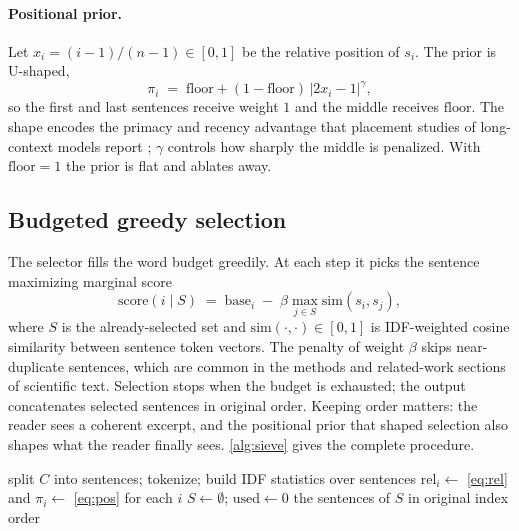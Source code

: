 \documentclass[preprint,12pt]{elsarticle}
\DeclarePairedDelimiter\abs{\lvert}{\rvert}
\theoremstyle{remark}
\newcommand{\method}{Sieve}
\begin{document}
\paragraph{Positional prior.}
Let $x_i = (i-1)/(n-1)\in[0,1]$ be the relative position of $s_i$. The
prior is U-shaped,
\begin{equation}
\label{eq:pos}
\pi_i \;=\; \mathrm{floor} + (1-\mathrm{floor})\,
\lvert 2x_i - 1\rvert^{\gamma},
\end{equation}
so the first and last sentences receive weight $1$ and the middle
receives $\mathrm{floor}$. The shape encodes the primacy and recency
advantage that placement studies of long-context models report
\citep{liu2023lost}; $\gamma$ controls how sharply the middle is
penalized. With $\mathrm{floor}=1$ the prior is flat and ablates away.

\subsection{Budgeted greedy selection}
The selector fills the word budget greedily. At each step it picks the
sentence maximizing marginal score
\begin{equation}
\label{eq:mmr}
\mathrm{score}(i \mid S) \;=\; \mathrm{base}_i
\;-\; \beta \max_{j \in S} \mathrm{sim}(s_i, s_j),
\end{equation}
where $S$ is the already-selected set and
$\mathrm{sim}(\cdot,\cdot)\in[0,1]$ is IDF-weighted cosine similarity
between sentence token vectors. The penalty of weight $\beta$ skips
near-duplicate sentences, which are common in the methods and
related-work sections of scientific text. Selection stops when the
budget is exhausted; the output concatenates selected sentences in
original order. Keeping order matters: the reader sees a coherent
excerpt, and the positional prior that shaped selection also shapes
what the reader finally sees. \autoref{alg:sieve} gives the complete
procedure.

\begin{algorithm}[t]
\caption{\method{} selection}
\label{alg:sieve}
split $C$ into sentences; tokenize; build IDF statistics over
sentences\;
$\mathrm{rel}_i \leftarrow$ \eqref{eq:rel} and
$\pi_i \leftarrow$ \eqref{eq:pos} for each $i$\;
$S \leftarrow \emptyset$; $\mathrm{used} \leftarrow 0$\;
\Return the sentences of $S$ in original index order
\end{algorithm}
\end{document}
